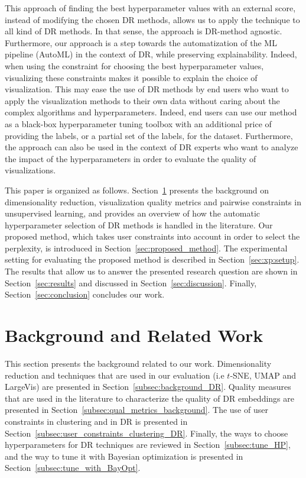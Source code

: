 This approach of finding the best hyperparameter values with an external score, instead of modifying the chosen DR methods, allows us to apply the technique to all kind of DR methods. In that sense, the approach is DR-method agnostic. Furthermore, our approach is a step towards the automatization of the ML pipeline (AutoML) in the context of DR, while preserving explainability. Indeed, when using the constraint for choosing the best hyperparameter values, visualizing these constraints makes it possible to explain the choice of visualization. This may ease the use of DR methods by end users who want to apply the visualization methods to their own data without caring about the complex algorithms and hyperparameters. Indeed, end users can use our method as a black-box hyperparameter tuning toolbox with an additional price of providing the labels, or a partial set of the labels, for the dataset. Furthermore, the approach can also be used in the context of DR experts who want to analyze the impact of the hyperparameters in order to evaluate the quality of visualizations.

This paper is organized as follows. Section~\ref{sec:background} presents the background on dimensionality reduction, visualization quality metrics and pairwise constraints in unsupervised learning, and provides an overview of how the automatic hyperparameter selection of DR methods is handled in the literature. Our proposed method, which takes user constraints into account in order to select the perplexity, is introduced in Section~\ref{sec:proposed_method}. The experimental setting for evaluating the proposed method is described in Section~\ref{sec:xp:setup}. The results that allow us to answer the presented research question are shown in Section~\ref{sec:results} and discussed in Section~\ref{sec:discussion}. Finally, Section~\ref{sec:conclusion} concludes our work.

\section{Background and Related Work}\label{sec:background}

This section presents the background related to our work. Dimensionality reduction and techniques that are used in our evaluation (i.e $t$-SNE, UMAP and LargeVis) are presented in Section~\ref{subsec:background_DR}. Quality measures that are used in the literature to characterize the quality of DR embeddings are presented in Section~\ref{subsec:qual_metrics_background}. The use of user constraints in clustering and in DR is presented in Section~\ref{subsec:user_constraints_clustering_DR}. Finally, the ways to choose hyperparameters for DR techniques are reviewed in Section~\ref{subsec:tune_HP}, and the way to tune it with Bayesian optimization is presented in Section~\ref{subsec:tune_with_BayOpt}.

